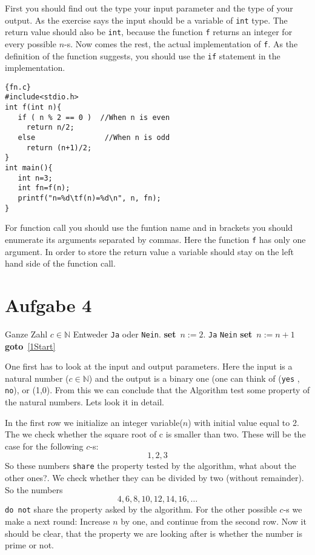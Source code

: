 \documentclass{article}[12pt]
\newcommand{\SET}{\textbf{set}\ }
\newcommand{\GOTO}{\textbf{goto}\ }
\begin{document}
First you should find out the type your input parameter and the type of your output. As the exercise says
the input should be a variable of \texttt{int} type. The return value should also be \texttt{int}, because
the function \texttt{f} returns an integer for every possible $n$-s. Now comes the rest, the actual
implementation of \texttt{f}. As the definition of the function suggests, you should use the \texttt{if} 
statement in the implementation.
\begin{lstlisting}{fn.c}
#include<stdio.h>
int f(int n){
   if ( n % 2 == 0 )  //When n is even
     return n/2;
   else                //When n is odd
     return (n+1)/2;
}
int main(){
   int n=3;
   int fn=f(n);
   printf("n=%d\tf(n)=%d\n", n, fn);
}
\end{lstlisting}
For function call you should use the funtion name and in brackets you should enumerate its
arguments separated by commas. Here the function \texttt{f} has only one argument. In order
to store the return value a variable should stay on the left hand side of the function call. 
\section{Aufgabe 4}
\begin{algorithm}[H]
\caption{}
\begin{algorithmic}[1]
\REQUIRE Ganze Zahl $c\in\mathbb{N}$
\ENSURE Entweder \verb|Ja| oder \verb|Nein|.
\STATE \SET $n := 2$.
 \label{1Start}
\RETURN \verb|Ja|
\ENDIF
{}
\RETURN \verb|Nein|
\ENDIF
\STATE \SET $n := n + 1$
\STATE \GOTO \ref{1Start}
\end{algorithmic}
\end{algorithm}
One first has to look at the input and output parameters. Here the input is a natural number ($c\in\mathbb{N}$) and the output is a 
binary one (one can think of (\texttt{yes} , \texttt{no}), or (1,0). From this we can conclude that the Algorithm test some property 
of the natural numbers. Lets look it in detail.  

In the first row we initialize an integer variable($n$) with initial value equal to 2. The we check whether the square root of c is smaller
than two. These will be the case for the following $c$-s:
\begin{equation}
1,2,3
\end{equation}
So these numbers \texttt{share} the property tested by the algorithm, what about the other ones?. We check whether they can be divided by two (without 
remainder). So the numbers
\begin{equation}
4,6,8,10,12,14,16,\ldots
\end{equation}
\texttt{do not} share the property asked by the algorithm. For the other possible $c$-s we make a next round: Increase $n$ by one, and continue from 
the second row. Now it should be clear, that the property we are looking after is whether the number is prime or not. 
\end{document}
